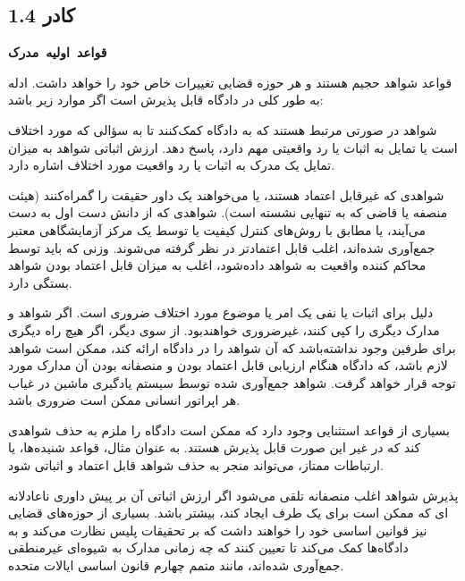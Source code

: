 \begin{tcolorbox}[colback=gray!10,colframe=black,breakable]

    \section*{کادر 1.4}
    \label{sec:کادر 1.4}
    \begin{Large}
        \textbf{\mbox{قواعد اولیه مدرک}}
    \end{Large}
    \newline
    قواعد شواهد حجیم هستند و هر حوزه قضایی تغییرات خاص خود را خواهد داشت.
    ادله به طور کلی در دادگاه قابل پذیرش است اگر موارد زیر باشد:

    \begin{description}[leftmargin=0.5cm,style=nextline]
        \item[مربوط:] شواهد در صورتی مرتبط هستند که به دادگاه کمک‌کنند تا به سؤالی که مورد اختلاف است یا تمایل به اثبات یا رد واقعیتی مهم دارد، پاسخ دهد.
        ارزش اثباتی شواهد به میزان تمایل یک مدرک به اثبات یا رد واقعیت مورد اختلاف اشاره دارد.
        \item[قابل اعتماد:] شواهدی که غیرقابل اعتماد هستند، یا می‌خواهند یک داور حقیقت را گمراه‌کنند (هیئت منصفه یا قاضی که به تنهایی نشسته است).
        شواهدی که از دانش دست اول به دست می‌آیند، یا مطابق با روش‌های کنترل کیفیت یا توسط یک مرکز آزمایشگاهی معتبر جمع‌آوری شده‌اند، اغلب قابل اعتمادتر در نظر گرفته می‌شوند.
        وزنی که باید توسط محاکم کننده واقعیت به شواهد داده‌شود، اغلب به میزان قابل اعتماد بودن شواهد بستگی دارد.
        \item[لازمه:] دلیل برای اثبات یا نفی یک امر یا موضوع مورد اختلاف ضروری است.
        اگر شواهد و مدارک دیگری را کپی کنند، غیرضروری خواهند‌بود.
        از سوی دیگر، اگر هیچ راه دیگری برای طرفین وجود نداشته‌باشد که آن شواهد را در دادگاه ارائه کند، ممکن است شواهد لازم باشد، که دادگاه هنگام ارزیابی قابل اعتماد بودن و منصفانه بودن آن مدارک مورد توجه قرار خواهد گرفت.
        شواهد جمع‌آوری شده توسط سیستم یادگیری ماشین در غیاب هر اپراتور انسانی ممکن است ضروری باشد.
        \item[مستثنی نشده:] بسیاری از قواعد استثنایی وجود دارد که ممکن است دادگاه را ملزم به حذف شواهدی کند که در غیر این صورت قابل پذیرش هستند.
        به عنوان مثال، قواعد شنیده‌ها، یا ارتباطات ممتاز، می‌تواند منجر به حذف شواهد قابل اعتماد و اثباتی شود.
        \item[منصفانه:] پذیرش شواهد اغلب منصفانه تلقی می‌شود اگر ارزش اثباتی آن بر پیش داوری ناعادلانه ای که ممکن است برای یک طرف ایجاد کند، بیشتر باشد.
        بسیاری از حوزه‌های قضایی نیز قوانین اساسی خود را خواهند داشت که بر تحقیقات پلیس نظارت می‌کند و به دادگاه‌ها کمک می‌کند تا تعیین کنند که چه زمانی مدارک به شیوه‌ای غیرمنطقی جمع‌آوری شده‌اند، مانند متمم چهارم قانون اساسی ایالات متحده.
    \end{description}
\end{tcolorbox}


